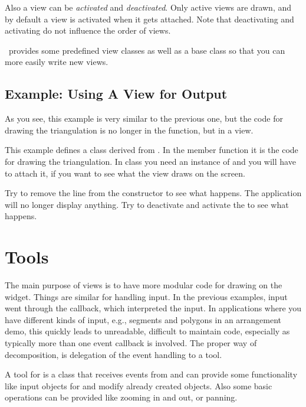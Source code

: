 Also a view can be {\em activated} and {\em deactivated}. Only active
views are drawn, and by default a view is activated when it gets
attached.  Note that deactivating and activating do not influence the
order of views.


\cgal\ provides some predefined view classes as well as a base class
so that you can more easily write new views.


\subsection{Example: Using A View for Output}

As you see, this example is very similar to the previous one, but
the code for drawing the triangulation is no longer in the 
 function, but in a view.

This example defines a class derived from . In the member
function  it is the code for drawing the triangulation. In 
 class you need an instance of  and you will 
have to attach it, if you want to see what the view draws on the
screen.

Try to remove the line  from the constructor to
see what happens. The application will no longer display anything. Try
to deactivate and activate the  to see what happens.


\section{Tools}
\label{Qt_widget_tools}

The main purpose of views is to have more modular code for drawing on
the widget. Things are similar for handling input. In the previous
examples, input went through the 
callback, which interpreted the input. In applications where you have
different kinds of input, e.g., segments and polygons in an
arrangement demo, this quickly leads to unreadable, difficult to maintain
code,  especially as typically more than one event callback is
involved. The proper way of decomposition, is delegation
of the event handling to a tool. 


A tool for  is a class that receives events from
 and can provide some functionality like input
objects for  and modify already created
objects. Also some basic operations can be provided like zooming in
and out, or panning.

